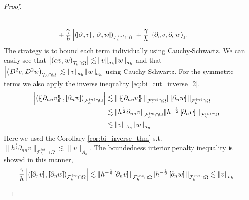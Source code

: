 \begin{proof}
\begin{enumerate}[label=\arabic*)]
\begin{equation}
\begin{split}
                                                     \\
                                                     & + \frac{\gamma }{h} \abs{ \left( \jump{ \partial _{n} v}, \jump{ \partial _{n} w   }   \right)_{\mathcal{F}_{h}^{int} \cap \Omega}  } + \frac{\gamma }{h} \abs{ \left(  \partial _{n} v,  \partial _{n} w
                                                     \right)_{\Gamma }  }
                    \end{split}
                \end{equation}
                The strategy is to bound each term individually using Cauchy-Schwartz. We can easily see that $\left\lvert \left( \alpha  v, w \right) _{\mathcal{T} _{h} \cap \Omega }   \right\rvert   \lesssim \| v \|_{a_{h}  }^{  } \| w \|_{ a_{h} }^{  } $ and that
                $\left\lvert \left( D^2 v, D^2w \right) _{\mathcal{T} _{h} \cap \Omega}   \right\rvert \lesssim \| v \|_{a_{h}  }^{  } \| w \|_{ a_{h} }^{  } $ using Cauchy Schwartz. For the symmetric terms we also apply the inverse inequality
                \eqref{eq:bi_cut_inverse_2}.
                \[
                    \begin{split}
                    \abs{\left( \mean{ \partial _{n n} v }, \jump{ \partial _{n}w }      \right)_{\mathcal{F}_{h}^{int} \cap \Omega}  } & \lesssim  \|\mean{ \partial _{n n} v }  \|_{ \mathcal{F}_{h}^{int} \cap \Omega}^{  }\|\jump{ \partial _{n} w }  \|_{
                    \mathcal{F}_{h}^{int} \cap \Omega}^{  } \\
                    & \lesssim  \|h^{\frac{1}{2}} \partial _{n n} v  \|_{ \mathcal{F}_{h}^{int} \cap \Omega}^{  }\| h^{-\frac{1}{2}} \jump{ \partial _{n} w }     \|_{\mathcal{F}_{h}^{int} \cap \Omega}^{  } \\
                    & \lesssim  \| v \|_{A_{h}  }^{  } \|w    \|_{ a_{h}}^{  }
                    \end{split}
                \]
                Here we used the Corollary \ref{cor:bi_inverse_thm} s.t.  $\|h^{\frac{1}{2}} \partial _{n n}  v \|_{\mathcal{F}_{h}^{int} \cap \Omega} \lesssim \| v \|_{ A_{h}  }^{  }  $.
              The boundedness interior penalty  inequality is showed in this manner, \[
             \frac{\gamma }{h} \abs{ \left( \jump{ \partial _{n} v}, \jump{ \partial _{n} w   }   \right)_{\mathcal{F}_{h}^{int} \cap \Omega}  }  \lesssim  \|h^{-\frac{1}{2}} \jump{ \partial _{n} v}  \|_{ \mathcal{F}_{h}^{int} \cap \Omega }^{  }
             \|h^{-\frac{1}{2}} \jump{ \partial _{n} w}  \|_{ \mathcal{F}_{h}^{int} \cap \Omega }^{  }  \lesssim  \| v  \|_{ a_{h} }^{  }
\]
\end{enumerate}
\end{proof}

